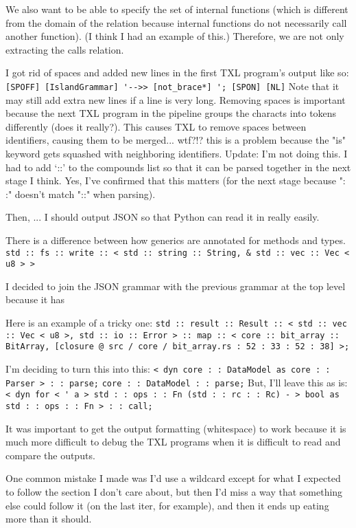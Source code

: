 \documentclass[11pt]{article}
\begin{document}
We also want to be able to specify the set of internal functions (which is different from the domain of the relation because internal functions do not necessarily call another function).
(I think I had an example of this.)
Therefore, we are not only extracting the calls relation.

I got rid of spaces and added new lines in the first TXL program's output like so:
\lstinline{[SPOFF] [IslandGrammar] '-->> [not_brace*] '; [SPON] [NL]}
Note that it may still add extra new lines if a line is very long.
Removing spaces is important because the next TXL program in the pipeline groups the characts into tokens differently (does it really?).
This causes TXL to remove spaces between identifiers, causing them to be merged... wtf?!?
    this is a problem because the "is" keyword gets squashed with neighboring identifiers.
Update:
I'm not doing this.
I had to add `::' to the compounds list so that it can be parsed together in the next stage I think.
    Yes, I've confirmed that this matters (for the next stage because ": :" doesn't match "::" when parsing).

Then, ... I should output JSON so that Python can read it in really easily.

There is a difference between how generics are annotated for methods and types.
\lstinline{std :: fs :: write :: < std :: string :: String, & std :: vec :: Vec < u8 > >}

I decided to join the JSON grammar with the previous grammar at the top level because it has 

Here is an example of a tricky one:
\lstinline{std :: result :: Result :: < std :: vec :: Vec < u8 >, std :: io :: Error > :: map :: < core :: bit_array :: BitArray, [closure @ src / core / bit_array.rs : 52 : 33 : 52 : 38] >;}

I'm deciding to turn this into this:
\lstinline{< dyn core : : DataModel as core : : Parser > : : parse;}
\lstinline{core : : DataModel : : parse;}
But, I'll leave this as is:
\lstinline{< dyn for < ' a > std : : ops : : Fn (std : : rc : : Rc) - > bool as std : : ops : : Fn > : : call;}

It was important to get the output formatting (whitespace) to work because it is much more difficult to debug the TXL programs when it is difficult to read and compare the outputs.


One common mistake I made was I'd use a wildcard except for what I expected to follow the section I don't care about, but then I'd miss a way that something else could follow it (on the last iter, for example), and then it ends up eating more than it should.
\end{document}
